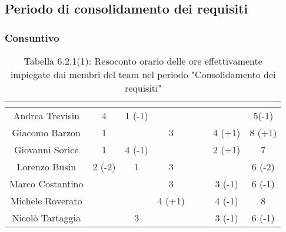 \subsection{Periodo di consolidamento dei requisiti}
\subsubsection{Consuntivo}
\renewcommand{\arraystretch}{1.5}
\begin{table}[H]
\begin{center}
\begin{tabular}{|c|c|c|c|c|c|c|c|}
\hline
\rowcolor{title_row}
\textbf{\color{title_text}{Nome}} & \textbf{\color{title_text}{Resp.}} & \textbf{\color{title_text}{Ammi.}} & \textbf{\color{title_text}{Analist.}} & \textbf{\color{title_text}{Progett.}} & \textbf{\color{title_text}{Program.}} & \textbf{\color{title_text}{Verific.}} & \textbf{\color{title_text}{Totale}} \\ \hline
Andrea Trevisin  & 4 & 1 (-1) & & & & & 5(-1) \\ \hline
Giacomo Barzon   & 1 & & 3 & & & 4 (+1) & 8 (+1) \\ \hline
Giovanni Sorice  & 1 & 4 (-1) & & & & 2 (+1) & 7  \\ \hline
Lorenzo Busin    & 2 (-2) & 1 & 3 & & & & 6 (-2) \\ \hline
Marco Costantino & & & 3 & & & 3 (-1) & 6 (-1) \\ \hline
Michele Roverato & & & 4 (+1) & & & 4 (-1) & 8 \\ \hline
Nicolò Tartaggia & & 3 & & & & 3 (-1) & 6 (-1)  \\ \hline
\end{tabular}
\caption{Tabella 6.2.1(1): Resoconto orario delle ore effettivamente impiegate dai membri del team nel periodo "Consolidamento dei requisiti"\label{}}
\end{center}
\end{table}
\renewcommand{\arraystretch}{1}

